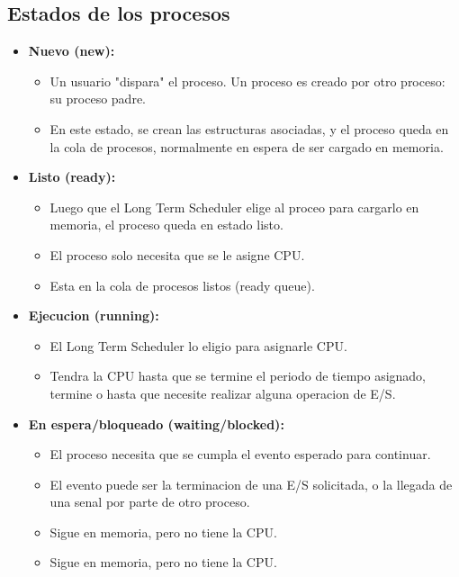 \subsection{Estados de los procesos}
\begin{itemize}
    \item \textbf{Nuevo (new):}
        \begin{itemize}
            \item Un usuario "dispara" el proceso. Un proceso es creado por otro proceso: su proceso padre.
            \item En este estado, se crean las estructuras asociadas, y el proceso queda en la cola de procesos, normalmente en espera de ser cargado en memoria.
        \end{itemize}
    \item \textbf{Listo (ready):}
        \begin{itemize}
            \item Luego que el Long Term Scheduler elige al proceo para cargarlo en memoria, el proceso queda en estado listo.
            \item El proceso solo necesita que se le asigne CPU.
            \item Esta en la cola de procesos listos (ready queue).
        \end{itemize}
    \item \textbf{Ejecucion (running):}
        \begin{itemize}
            \item El Long Term Scheduler lo eligio para asignarle CPU.
            \item Tendra la CPU hasta que se termine el periodo de tiempo asignado, termine o hasta que necesite realizar alguna operacion de E/S.
        \end{itemize}
    \item \textbf{En espera/bloqueado (waiting/blocked):}
    \begin{itemize}
        \item El proceso necesita que se cumpla el evento esperado para continuar.
        \item El evento puede ser la terminacion de una E/S solicitada, o la llegada de una senal por parte de otro proceso.
        \item Sigue en memoria, pero no tiene la CPU.
        \item Sigue en memoria, pero no tiene la CPU.
    \end{itemize}
\end{itemize}

